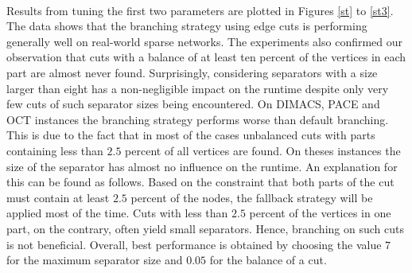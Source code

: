 \documentclass[12pt,a4paper,twoside]{scrartcl}
\numberwithin{equation}{section}
\begin{document}
\paragraph{}
Results from tuning the first two parameters are plotted in Figures \ref{st} to \ref{st3}. The data shows that the branching strategy using edge cuts is performing generally well on real-world sparse networks. The experiments also confirmed our observation that cuts with a balance of at least ten percent of the vertices in each part are almost never found. Surprisingly, considering separators with a size larger than eight has a non-negligible impact on the runtime despite only very few cuts of such separator sizes being encountered. On DIMACS, PACE and OCT instances the branching strategy performs worse than default branching. This is due to the fact that in most of the cases unbalanced cuts with parts containing less than $2.5$ percent of all vertices are found. On theses instances the size of the separator has almost no influence on the runtime. An explanation for this can be found as follows. Based on the constraint that both parts of the cut must contain at least $2.5$ percent of the nodes, the fallback strategy will be applied most of the time. Cuts with less than $2.5$ percent of the vertices in one part, on the contrary, often yield small separators. Hence, branching on such cuts is not beneficial.  Overall, best performance is obtained by choosing the value $7$ for the maximum separator size and $0.05$ for the balance of a cut.
\end{document}
